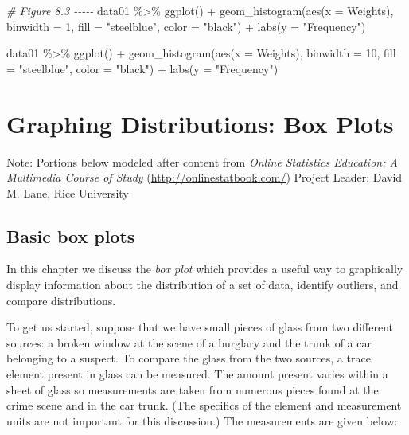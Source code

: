 \documentclass[
]{book}
\newenvironment{Shaded}{\begin{snugshade}}{\end{snugshade}}
\newcommand{\AttributeTok}[1]{\textcolor[rgb]{0.77,0.63,0.00}{#1}}
\newcommand{\CommentTok}[1]{\textcolor[rgb]{0.56,0.35,0.01}{\textit{#1}}}
\newcommand{\DecValTok}[1]{\textcolor[rgb]{0.00,0.00,0.81}{#1}}
\newcommand{\FunctionTok}[1]{\textcolor[rgb]{0.00,0.00,0.00}{#1}}
\newcommand{\NormalTok}[1]{#1}
\newcommand{\SpecialCharTok}[1]{\textcolor[rgb]{0.00,0.00,0.00}{#1}}
\newcommand{\StringTok}[1]{\textcolor[rgb]{0.31,0.60,0.02}{#1}}
\begin{document}
\begin{Shaded}
\begin{Highlighting}[]
\CommentTok{\# Figure 8.3 {-}{-}{-}{-}{-}}
\NormalTok{data01 }\SpecialCharTok{\%\textgreater{}\%} \FunctionTok{ggplot}\NormalTok{() }\SpecialCharTok{+} 
  \FunctionTok{geom\_histogram}\NormalTok{(}\FunctionTok{aes}\NormalTok{(}\AttributeTok{x =}\NormalTok{ Weights), }\AttributeTok{binwidth =} \DecValTok{1}\NormalTok{, }\AttributeTok{fill =} \StringTok{"steelblue"}\NormalTok{, }\AttributeTok{color =} \StringTok{"black"}\NormalTok{) }\SpecialCharTok{+} 
  \FunctionTok{labs}\NormalTok{(}\AttributeTok{y =} \StringTok{"Frequency"}\NormalTok{)}

\NormalTok{data01 }\SpecialCharTok{\%\textgreater{}\%} \FunctionTok{ggplot}\NormalTok{() }\SpecialCharTok{+} 
  \FunctionTok{geom\_histogram}\NormalTok{(}\FunctionTok{aes}\NormalTok{(}\AttributeTok{x =}\NormalTok{ Weights), }\AttributeTok{binwidth =} \DecValTok{10}\NormalTok{, }\AttributeTok{fill =} \StringTok{"steelblue"}\NormalTok{, }\AttributeTok{color =} \StringTok{"black"}\NormalTok{) }\SpecialCharTok{+} 
  \FunctionTok{labs}\NormalTok{(}\AttributeTok{y =} \StringTok{"Frequency"}\NormalTok{)}
\end{Highlighting}
\end{Shaded}

\hypertarget{graphing-distributions-box-plots}{%
\chapter{Graphing Distributions: Box Plots}\label{graphing-distributions-box-plots}}

Note: Portions below modeled after content from
\emph{Online Statistics Education: A Multimedia Course of Study}
(\url{http://onlinestatbook.com/}) Project Leader: David M. Lane, Rice University

\hypertarget{basic-box-plots}{%
\section{Basic box plots}\label{basic-box-plots}}

In this chapter we discuss the \emph{box plot} which provides a useful way to graphically
display information about the distribution of a set of data,
identify outliers, and compare distributions.

To get us started, suppose that we have small pieces of glass from two different
sources: a broken window at the scene of a burglary and the trunk of a car
belonging to a suspect. To compare the glass from the two sources, a trace
element present in glass can be measured. The amount present varies within
a sheet of glass so measurements are taken from numerous pieces found at the
crime scene and in the car trunk. (The specifics of the element and measurement
units are not important for this discussion.) The measurements are given below:
\end{document}
